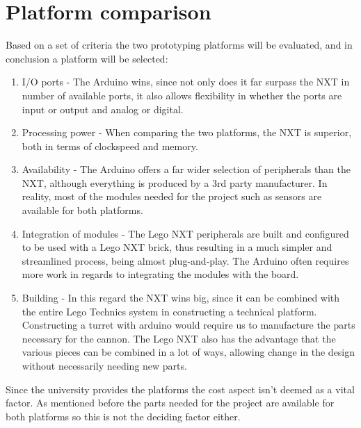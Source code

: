 \section{Platform comparison}
Based on a set of criteria the two prototyping platforms will be evaluated, and
in conclusion a platform will be selected:

\begin{enumerate}
  \item I/O ports - The Arduino wins, since not only does it far surpass
  the NXT in number of available ports, it also allows flexibility in
  whether the ports are input or output and analog or digital.
  \item Processing power - When comparing the two platforms, the NXT is
  superior, both in terms of clockspeed and memory.
  \item Availability - The Arduino offers a far wider selection of peripherals
  than the NXT, although everything is produced by a 3rd party manufacturer. In
  reality, most of the modules needed for the project such as sensors are
  available for both platforms.
  \item Integration of modules - The Lego NXT peripherals are built and
  configured to be used with a Lego NXT brick, thus resulting in a much simpler
  and streamlined process, being almost plug-and-play. The Arduino often
  requires more work in regards to integrating the modules with the board.
  \item Building - In this regard the NXT wins big, since it can be combined
  with the entire Lego Technics system in constructing a technical platform.
  Constructing a turret with arduino would require us to manufacture the parts
  necessary for the cannon. The Lego NXT also has the advantage that the various
  pieces can be combined in a lot of ways, allowing change in the design
  without necessarily needing new parts.
\end{enumerate}

Since the university provides the platforms the cost aspect isn't deemed as a
vital factor. As mentioned before the parts needed for the project are
available for both platforms so this is not the deciding factor either.

